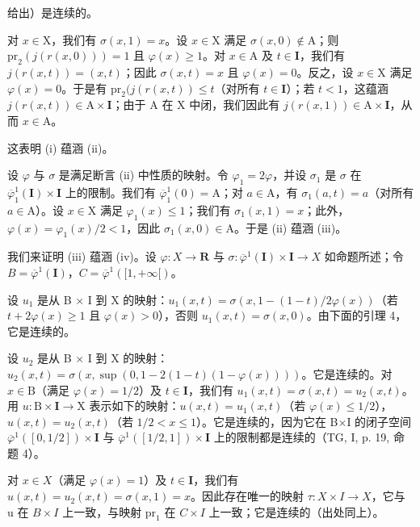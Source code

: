 给出）是连续的。

对 \(x \in \mathrm{X}\)，我们有 \(\sigma(x,1) = x\)。设 \(x \in \mathrm{X}\) 满足 \(\sigma(x,0) \notin \mathrm{A}\)；则 \(\mathrm{pr}_2(j(r(x,0))) = 1\) 且 \(\varphi(x) \geqslant 1\)。对 \(x \in \mathrm{A}\) 及 \(t \in \mathbf{I}\)，我们有 \(j(r(x,t)) = (x,t)\)；因此 \(\sigma(x,t) = x\) 且 \(\varphi(x) = 0\)。反之，设 \(x \in \mathrm{X}\) 满足 \(\varphi(x) = 0\)。于是有 \(\mathrm{pr}_2(j(r(x,t)) \leqslant t\)（对所有 \(t \in \mathbf{I}\)）；若 \(t < 1\)，这蕴涵 \(j(r(x,t)) \in \mathrm{A} \times \mathbf{I}\)；由于 A 在 X 中闭，我们因此有 \(j(r(x,1)) \in \mathrm{A} \times \mathbf{I}\)，从而 \(x \in \mathrm{A}\)。

这表明 (i) 蕴涵 (ii)。

设 \(\varphi\) 与 \(\sigma\) 是满足断言 (ii) 中性质的映射。令 \(\varphi_1 = 2\varphi\)，并设 \(\sigma_1\) 是 \(\sigma\) 在 \(\overline{\varphi}_1^1 (\mathbf{I})\times \mathbf{I}\) 上的限制。我们有 \(\overline{\varphi}_1^1 (0) = \mathrm{A}\)；对 \(a\in \mathrm{A}\)，有 \(\sigma_1(a,t) = a\)（对所有 \(a\in \mathrm{A}\)）。设 \(x\in \mathrm{X}\) 满足 \(\varphi_{1}(x)\leqslant 1\)；我们有 \(\sigma_1(x,1) = x\)；此外，\(\varphi (x) = \varphi_{1}(x) / 2 < 1\)，因此 \(\sigma_{1}(x,0)\in \mathrm{A}\)。于是 (ii) 蕴涵 (iii)。

我们来证明 (iii) 蕴涵 (iv)。设 \(\varphi\colon X\to\mathbf{R}\) 与 \(\sigma\colon\overline{\varphi}^{1}(\mathbf{I})\times\mathbf{I}\to X\) 如命题所述；令 \(B=\overline{\varphi}^{1}(\mathbf{I})\)，\(C=\overline{\varphi}^{1}([1,+\infty[)\)。

设 \(u_1\) 是从 B × I 到 X 的映射：\(u_1(x,t) = \sigma(x,1 - (1 - t)/2\varphi(x))\)（若 \(t + 2\varphi(x) \geqslant 1\) 且 \(\varphi(x) > 0\)），否则 \(u_1(x,t) = \sigma(x,0)\)。由下面的引理 4，它是连续的。

设 \(u_2\) 是从 B × I 到 X 的映射：\(u_2(x,t)=\sigma(x,\sup(0,1-2(1-t)(1-\varphi(x))))\)。它是连续的。对 \(x\in\mathrm{B}\)（满足 \(\varphi(x)=1/2\)）及 \(t\in\mathbf{I}\)，我们有 \(u_1(x,t)=\sigma(x,t)=u_2(x,t)\)。用 \(u:\mathrm{B}\times\mathbf{I}\to\mathrm{X}\) 表示如下的映射：\(u(x,t)=u_1(x,t)\)（若 \(\varphi(x)\leqslant1/2\)），\(u(x,t)=u_2(x,t)\)（若 \(1/2<x\leqslant1\)）。它是连续的，因为它在 B×I 的闭子空间 \(\overline{\varphi}^{1}([0,1/2])\times\mathbf{I}\) 与 \(\overline{\varphi}^{1}([1/2,1])\times\mathbf{I}\) 上的限制都是连续的（TG, I, p. 19, 命题 4）。

对 \(x\in X\)（满足 \(\varphi(x)=1\)）及 \(t\in\mathbf{I}\)，我们有 \(u(x,t)=u_2(x,t)=\sigma(x,1)=x\)。因此存在唯一的映射 \(\tau:X\times I\to X\)，它与 u 在 \(B\times I\) 上一致，与映射 \(\mathrm{pr}_1\) 在 \(C\times I\) 上一致；它是连续的（出处同上）。

